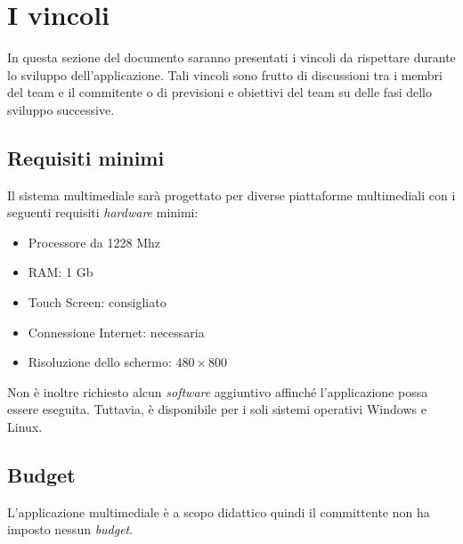 \section{I vincoli}
In questa sezione del documento saranno presentati i vincoli da rispettare durante lo sviluppo dell'applicazione. Tali vincoli sono frutto di discussioni tra i membri del team e il commitente o di previsioni e obiettivi del team su delle fasi dello sviluppo successive.

\subsection{Requisiti minimi}
Il sistema multimediale sarà progettato per diverse piattaforme multimediali con i seguenti requisiti \emph{hardware} minimi:
\begin{itemize}
	\item Processore da 1228 Mhz
	\item RAM: 1 Gb
	\item Touch Screen: consigliato 
	\item Connessione Internet: necessaria
	\item Risoluzione dello schermo: $480 \times 800$
\end{itemize}
Non è inoltre richiesto alcun \textit{software} aggiuntivo affinché l'applicazione possa essere eseguita. Tuttavia, \ProjectTitle{} è disponibile per i soli sistemi operativi \textsf{Windows} e \textsf{Linux}.

\subsection{Budget}
L'applicazione multimediale è a scopo didattico quindi il committente non ha imposto nessun \emph{budget}.